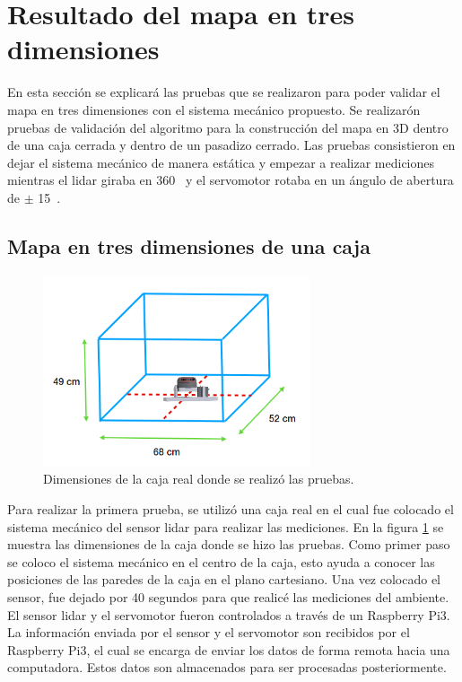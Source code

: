 \section{Resultado del mapa en tres dimensiones}
En esta sección se explicará las pruebas que se realizaron para poder validar el mapa en 
tres dimensiones con el sistema mecánico propuesto. Se realizarón pruebas de validación 
del algoritmo para la construcción del mapa en 3D dentro de una caja cerrada y dentro de 
un pasadizo cerrado. Las pruebas consistieron en dejar el sistema mecánico de manera 
estática y empezar a realizar mediciones mientras el lidar giraba en 360\grad~ y el 
servomotor rotaba en un ángulo de abertura de $\pm$ 15\grad~.

\subsection{Mapa en tres dimensiones de una caja}
\label{sec:MapaCaja}
\begin{figure}
  \centering \footnotesize
  \includegraphics[width=0.70\textwidth]{images/caja_lidar3D.png}
  \captionsetup{font=footnotesize}
  \caption{Dimensiones de la caja real donde se realizó las pruebas.}
  \label{fig:dim_cajaReal}
\end{figure}

Para realizar la primera prueba, se utilizó una caja real en el cual fue colocado 
el sistema mecánico del sensor lidar para realizar las mediciones. En la figura 
\ref{fig:dim_cajaReal} se muestra las dimensiones de la caja donde se hizo las 
pruebas. Como primer paso se coloco el sistema mecánico en el centro de la caja, esto
ayuda a conocer las posiciones de las paredes de la caja en el plano cartesiano. Una 
vez colocado el sensor, fue dejado por 40 segundos para que realicé las mediciones del 
ambiente. El sensor lidar y el servomotor fueron controlados a través de un Raspberry 
Pi3. La información enviada por el sensor y el servomotor son recibidos por el Raspberry 
Pi3, el cual se encarga de enviar los datos de forma remota hacia una computadora. Estos 
datos son almacenados para ser procesadas posteriormente.

